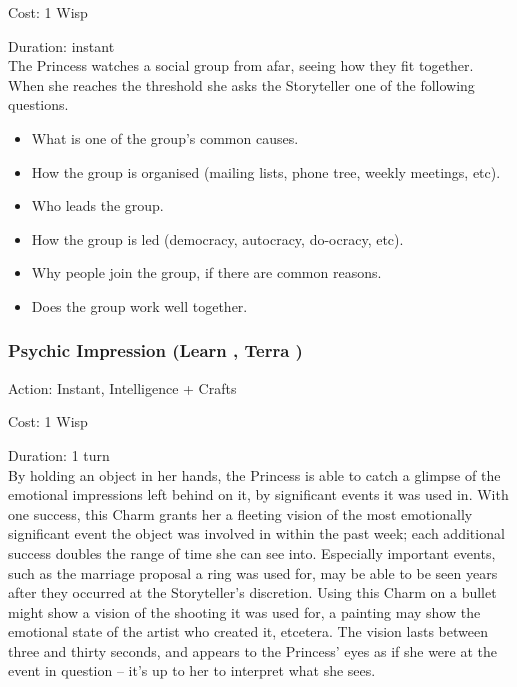 \noindent Cost: 1 Wisp

\noindent Duration: instant \\

\noindent The Princess watches a social group from afar, seeing how they fit together. When she reaches the threshold she asks the Storyteller one of the following questions. 

    \begin{itemize}\item What is one of the group's common causes.
    \item How the group is organised (mailing lists, phone tree, weekly meetings, etc).
    \item Who leads the group. 
    \item How the group is led (democracy, autocracy, do-ocracy, etc).
    \item Why people join the group, if there are common reasons.
    \item Does the group work well together.
    \end{itemize}

\subsubsection*{Psychic Impression (Learn \textbullet\textbullet\textbullet, Terra \textbullet)}

\noindent Action: Instant, Intelligence + Crafts

\noindent Cost: 1 Wisp

\noindent Duration: 1 turn \\

\noindent By holding an object in her hands, the Princess is able to catch a glimpse of the emotional impressions left behind on it, by significant events it was used in. With one success, this Charm grants her a fleeting vision of the most emotionally significant event the object was involved in within the past week; each additional success doubles the range of time she can see into. Especially important events, such as the marriage proposal a ring was used for, may be able to be seen years after they occurred at the Storyteller's discretion. Using this Charm on a bullet might show a vision of the shooting it was used for, a painting may show the emotional state of the artist who created it, etcetera. The vision lasts between three and thirty seconds, and appears to the Princess' eyes as if she were at the event in question -- it's up to her to interpret what she sees.

